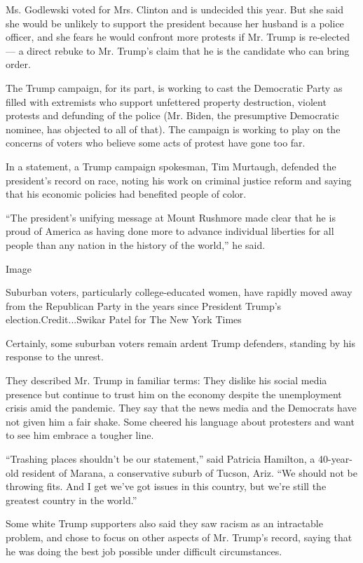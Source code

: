 Ms. Godlewski voted for Mrs. Clinton and is undecided this year. But she
said she would be unlikely to support the president because her husband
is a police officer, and she fears he would confront more protests if
Mr. Trump is re-elected --- a direct rebuke to Mr. Trump's claim that he
is the candidate who can bring order.

The Trump campaign, for its part, is working to cast the Democratic
Party as filled with extremists who support unfettered property
destruction, violent protests and defunding of the police (Mr. Biden,
the presumptive Democratic nominee, has objected to all of that). The
campaign is working to play on the concerns of voters who believe some
acts of protest have gone too far.

In a statement, a Trump campaign spokesman, Tim Murtaugh, defended the
president's record on race, noting his work on criminal justice reform
and saying that his economic policies had benefited people of color.

``The president's unifying message at Mount Rushmore made clear that he
is proud of America as having done more to advance individual liberties
for all people than any nation in the history of the world,'' he said.

Image

Suburban voters, particularly college-educated women, have rapidly moved
away from the Republican Party in the years since President Trump's
election.Credit...Swikar Patel for The New York Times

Certainly, some suburban voters remain ardent Trump defenders, standing
by his response to the unrest.

They described Mr. Trump in familiar terms: They dislike his social
media presence but continue to trust him on the economy despite the
unemployment crisis amid the pandemic. They say that the news media and
the Democrats have not given him a fair shake. Some cheered his language
about protesters and want to see him embrace a tougher line.

``Trashing places shouldn't be our statement,'' said Patricia Hamilton,
a 40-year-old resident of Marana, a conservative suburb of Tucson, Ariz.
``We should not be throwing fits. And I get we've got issues in this
country, but we're still the greatest country in the world.''

Some white Trump supporters also said they saw racism as an intractable
problem, and chose to focus on other aspects of Mr. Trump's record,
saying that he was doing the best job possible under difficult
circumstances.


